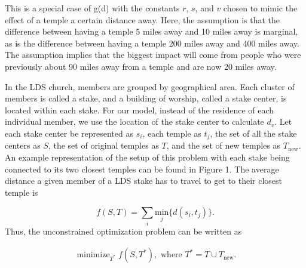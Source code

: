 \documentclass[twoside,twocolumn]{article}
\DeclareMathOperator*{\minimize}{minimize}
\begin{document}
This is a special case of g(d) with the constants $r$, $s$, and $v$ chosen to mimic the effect of a temple a certain distance away.
Here, the assumption is that the difference between having a temple 5 miles away and 10 miles away is marginal, as is the difference between having a temple 200 miles away and 400 miles away.
The assumption implies that the biggest impact will come from people who were previously about 90 miles away from a temple and are now 20 miles away.

In the LDS church, members are grouped by geographical area.
Each cluster of members is called a stake, and a building of worship, called a stake center, is located within each stake.
For our model, instead of the residence of each individual member, we use the location of the stake center to calculate $d_{v}$.
Let each stake center be represented as $s_i$, each temple as $t_j$, the set of all the stake centers as $S$, the set of original temples as $T$, and the set of new temples as $T_{\text{new}}$. %
An example representation of the setup of this problem with each stake being connected to its two closest temples can be found in Figure 1.
The average distance a given member of a LDS stake has to travel to get to their closest temple is

\begin{equation}
	f(S,T) = \sum_i \underset{j}{\text{min}}\{d(s_i,t_j)\}.
\end{equation}
Thus, the unconstrained optimization problem can be written as

\begin{equation}
\begin{aligned}
	\minimize_{T^*} f(S,T^*), \text{ where } T^* = T \cup T_{\text{new}}.
\end{aligned}
\end{equation}
\end{document}
